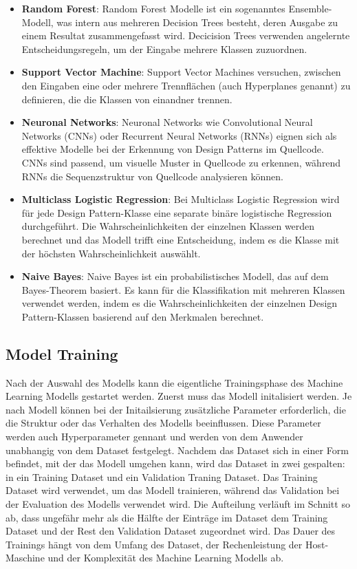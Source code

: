 \documentclass[conference]{IEEEtran}
\begin{document}
\begin{itemize}
    \item \textbf{Random Forest}: Random Forest Modelle ist ein sogenanntes Ensemble-Modell, was intern aus mehreren Decision Trees besteht, deren Ausgabe zu einem Resultat zusammengefasst wird. Decicision Trees verwenden angelernte Entscheidungsregeln, um der Eingabe mehrere Klassen zuzuordnen.
    \item \textbf{Support Vector Machine}: Support Vector Machines versuchen, zwischen den Eingaben eine oder mehrere Trennflächen (auch Hyperplanes genannt) zu definieren, die die Klassen von einandner trennen.
    \item \textbf{Neuronal Networks}: Neuronal Networks wie Convolutional Neural Networks (CNNs) oder Recurrent Neural Networks (RNNs) eignen sich als effektive Modelle bei der Erkennung von Design Patterns im Quellcode. CNNs sind passend, um visuelle Muster in Quellcode zu erkennen, während RNNs die Sequenzstruktur von Quellcode analysieren können. 
    \item \textbf{Multiclass Logistic Regression}: Bei Multiclass Logistic Regression wird für jede Design Pattern-Klasse eine separate binäre logistische Regression durchgeführt. Die Wahrscheinlichkeiten der einzelnen Klassen werden berechnet und das Modell trifft eine Entscheidung, indem es die Klasse mit der höchsten Wahrscheinlichkeit auswählt.
    \item \textbf{Naive Bayes}: Naive Bayes ist ein probabilistisches Modell, das auf dem Bayes-Theorem basiert. Es kann für die Klassifikation mit mehreren Klassen verwendet werden, indem es die Wahrscheinlichkeiten der einzelnen Design Pattern-Klassen basierend auf den Merkmalen berechnet.
\end{itemize}

\subsection{Model Training}

Nach der Auswahl des Modells kann die eigentliche Trainingsphase des Machine Learning Modells gestartet werden. 
Zuerst muss das Modell initalisiert werden. Je nach Modell können bei der Initailsierung zusätzliche Parameter erforderlich, die die Struktur oder das Verhalten des Modells beeinflussen. Diese Parameter werden auch Hyperparameter gennant und werden von dem Anwender unabhangig von dem Dataset festgelegt.
Nachdem das Dataset sich in einer Form befindet, mit der das Modell umgehen kann, wird das Dataset in zwei gespalten: in ein Training Dataset und ein Validation Traning Dataset.
Das Training Dataset wird verwendet, um das Modell trainieren, während das Validation bei der Evaluation des Modells verwendet wird. Die Aufteilung verläuft im Schnitt so ab, dass ungefähr mehr als die Hälfte der Einträge im Dataset dem Training Dataset und der Rest den Validation Dataset zugeordnet wird.
Das Dauer des Trainings hängt von dem Umfang des Dataset, der Rechenleistung der Host-Maschine und der Komplexität des Machine Learning Modells ab.
\end{document}
